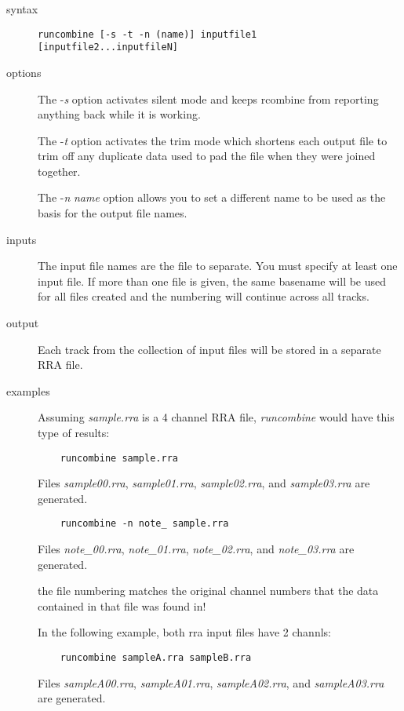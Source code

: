 \documentclass{article}
\begin{document}
\begin{description}

\item[syntax]

\begin{verbatim}
runcombine [-s -t -n (name)] inputfile1 [inputfile2...inputfileN]
\end{verbatim}

\item[options]

The -{\it s}
option activates silent mode and keeps rcombine from reporting anything back
while it is working.

The -{\it t} option
activates the trim mode which shortens each output file to trim off 
any duplicate data used to pad the file when they were joined together.

The -{\it n} {\it name} option
allows you to set a different name to be used as the basis for the
output file names.

\item[inputs]

The input file names are the file to separate.
You must specify at least one input file. If more than
one file is given, the same basename will be used for all files created 
and the numbering will continue across all tracks.

\item[output]

Each track from the collection of input files will be stored in
a separate RRA file.

\item[examples]

Assuming {\it sample.rra} is a 4 channel RRA file, {\it runcombine} would have this
type of results:

\begin{verbatim}
    runcombine sample.rra   
\end{verbatim}

Files {\it sample00.rra}, {\it sample01.rra}, {\it sample02.rra}, and
{\it sample03.rra}
are generated.

\begin{verbatim}
    runcombine -n note_ sample.rra   
\end{verbatim}
Files {\it note\_00.rra}, {\it note\_01.rra}, {\it note\_02.rra}, and
{\it note\_03.rra}
are generated.

the file numbering matches the original channel numbers that the data
contained in that file was found in!

In the following example, both rra input files have 2 channls:

\begin{verbatim}
    runcombine sampleA.rra sampleB.rra 
\end{verbatim}

Files {\it sampleA00.rra}, {\it sampleA01.rra}, {\it sampleA02.rra}, and
{\it sampleA03.rra}
are generated.

\end{description}
\end{document}

